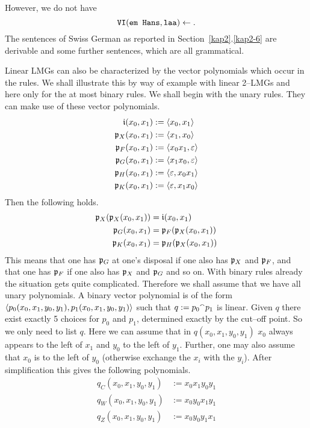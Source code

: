 However, we do not have
\begin{equation}
\mbox{\tt VI}(\mbox{\tt em Hans}, \mbox{\tt laa}) \leftarrow .
\end{equation}
The sentences of Swiss German as reported in Section~\ref{kap2}.\ref{kap2-6}
are derivable and some further sentences, which are all
grammatical.

Linear LMGs can also be characterized by the vector polynomials
which occur in the rules. We shall illustrate this by way of
example with linear 2--LMGs and here only for the at most
binary rules. We shall begin with the unary rules.
They can make use of these vector polynomials.
\begin{equation}
\begin{split}
\mathfrak{i}(x_0,x_1) & := \langle x_0,x_1\rangle \\
\mathfrak{p}_X(x_0,x_1) & := \langle x_1, x_0\rangle \\
\mathfrak{p}_F(x_0,x_1) & := \langle x_0x_1, \varepsilon \rangle \\
\mathfrak{p}_G(x_0, x_1) & := \langle x_1x_0, \varepsilon \rangle \\
\mathfrak{p}_H(x_0,x_1) & := \langle \varepsilon, x_0x_1\rangle \\
\mathfrak{p}_K(x_0,x_1) & := \langle \varepsilon, x_1x_0\rangle
\end{split}
\end{equation}
Then the following holds.
\begin{align}
\notag
\mathfrak{p}_X(\mathfrak{p}_X(x_0,x_1)) & = \mathfrak{i}(x_0, x_1) \\
\mathfrak{p}_G(x_0,x_1) & = \mathfrak{p}_F(\mathfrak{p}_X(x_0,x_1)) \\
\notag
\mathfrak{p}_K(x_0,x_1) & = \mathfrak{p}_H(\mathfrak{p}_X(x_0,x_1))
\end{align}
This means that one has $\mathfrak{p}_G$ at one's disposal if one also has
$\mathfrak{p}_X$ and $\mathfrak{p}_F$, and that one has $\mathfrak{p}_F$ if one also has $\mathfrak{p}_X$
and $\mathfrak{p}_G$ and so on. With binary rules already the situation
gets quite complicated. Therefore we shall assume that we have all
unary polynomials. A binary vector polynomial is of the form $\langle
p_0(x_0, x_1, y_0, y_1), p_1(x_0, x_1, y_0, y_1)\rangle$ such that $q
:= p_0 {^{\smallfrown}} p_1$ is linear. Given $q$ there exist exactly 5 
choices for $p_0$ and $p_1$, determined exactly by the cut--off 
point. So we only need to list $q$. Here we can assume that in
$q(x_0,x_1,y_0,y_1)$ $x_0$ always appears to the left of $x_1$ and
$y_0$ to the left of $y_1$. Further, one may also assume that
$x_0$ is to the left of $y_0$ (otherwise exchange the $x_i$ with
the $y_i$). After simplification this gives the following polynomials.
\begin{equation}
\begin{split}
q_C(x_0,x_1, y_0,y_1) & := x_0x_1y_0y_1 \\
q_W(x_0,x_1, y_0,y_1) & := x_0y_0x_1y_1 \\
q_Z(x_0,x_1, y_0,y_1) & := x_0y_0y_1x_1
\end{split}
\end{equation}
